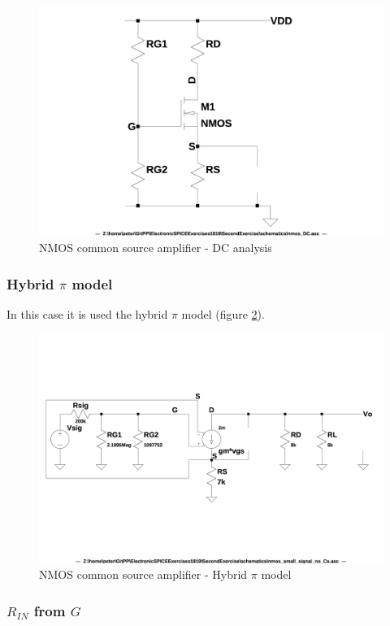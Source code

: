 \documentclass[10pt,a4paper]{book}
\begin{document}
\begin{figure}[h]
  \centering
  \includegraphics[width=12cm]{schematics/nmos_DC.jpg}
  \caption{NMOS common source amplifier - DC analysis}
  \label{nmos_DC_no_Cs}
\end{figure}

\subsubsection{Hybrid $\pi$ model}
In this case it is used the hybrid $\pi$ model (figure \ref{nmos_pi_no_Cs}).\par

\begin{figure}[h]
  \centering
  \includegraphics[width=12cm]{schematics/nmos_small_signal_no_Cs.jpg}
  \caption{NMOS common source amplifier - Hybrid $\pi$ model}
  \label{nmos_pi_no_Cs}
\end{figure}

\subsubsection{$R_{IN}$ from $G$}
\end{document}
